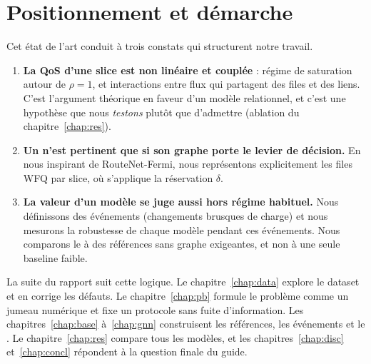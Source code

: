 \section{Positionnement et démarche}\label{sec:sota-position}
Cet état de l'art conduit à trois constats qui structurent notre travail.
\begin{enumerate}
  \item \textbf{La QoS d'une slice est non linéaire et couplée} : régime de saturation autour de $\rho=1$, et interactions entre flux qui partagent des files et des liens. C'est l'argument théorique en faveur d'un modèle relationnel, et c'est une hypothèse que nous \emph{testons} plutôt que d'admettre (ablation du chapitre~\ref{chap:res}).
  \item \textbf{Un \gnn{} n'est pertinent que si son graphe porte le levier de décision.} En nous inspirant de RouteNet-Fermi, nous représentons explicitement les files WFQ par slice, où s'applique la réservation $\delta$.
  \item \textbf{La valeur d'un modèle se juge aussi hors régime habituel.} Nous définissons des événements (changements brusques de charge) et nous mesurons la robustesse de chaque modèle pendant ces événements. Nous comparons le \gnn{} à des références sans graphe exigeantes, et non à une seule baseline faible.
\end{enumerate}
La suite du rapport suit cette logique. Le chapitre~\ref{chap:data} explore le dataset et en corrige les défauts. Le chapitre~\ref{chap:pb} formule le problème comme un jumeau numérique et fixe un protocole sans fuite d'information. Les chapitres~\ref{chap:base} à~\ref{chap:gnn} construisent les références, les événements et le \gnn. Le chapitre~\ref{chap:res} compare tous les modèles, et les chapitres~\ref{chap:disc} et~\ref{chap:concl} répondent à la question finale du guide.
